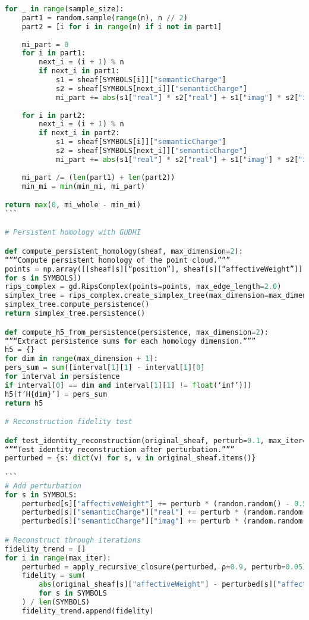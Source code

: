 \documentclass[11pt]{article}
\begin{document}
\begin{lstlisting}[language=Python, caption={EEG-LIGO Combined Analysis - Complete Code}]
for _ in range(sample_size):
    part1 = random.sample(range(n), n // 2)
    part2 = [i for i in range(n) if i not in part1]
    
    mi_part = 0
    for i in part1:
        next_i = (i + 1) % n
        if next_i in part1:
            s1 = sheaf[SYMBOLS[i]]["semanticCharge"]
            s2 = sheaf[SYMBOLS[next_i]]["semanticCharge"]
            mi_part += abs(s1["real"] * s2["real"] + s1["imag"] * s2["imag"])
    
    for i in part2:
        next_i = (i + 1) % n
        if next_i in part2:
            s1 = sheaf[SYMBOLS[i]]["semanticCharge"]
            s2 = sheaf[SYMBOLS[next_i]]["semanticCharge"]
            mi_part += abs(s1["real"] * s2["real"] + s1["imag"] * s2["imag"])
    
    mi_part /= (len(part1) + len(part2))
    min_mi = min(min_mi, mi_part)

return max(0, mi_whole - min_mi)
```

# Persistent homology with GUDHI

def compute_persistent_homology(sheaf, max_dimension=2):
“”“Compute persistent homology of the point cloud.”””
points = np.array([[sheaf[s][“position”], sheaf[s][“affectiveWeight”]]
for s in SYMBOLS])
rips_complex = gd.RipsComplex(points=points, max_edge_length=2.0)
simplex_tree = rips_complex.create_simplex_tree(max_dimension=max_dimension + 1)
simplex_tree.compute_persistence()
return simplex_tree.persistence()

def compute_h5_from_persistence(persistence, max_dimension=2):
“”“Extract persistence sums for each homology dimension.”””
h5 = {}
for dim in range(max_dimension + 1):
pers_sum = sum([interval[1][1] - interval[1][0]
for interval in persistence
if interval[0] == dim and interval[1][1] != float(‘inf’)])
h5[f’H{dim}’] = pers_sum
return h5

# Reconstruction fidelity test

def test_identity_reconstruction(original_sheaf, perturb=0.1, max_iter=25):
“”“Test identity reconstruction after perturbation.”””
perturbed = {s: dict(v) for s, v in original_sheaf.items()}

```
# Add perturbation
for s in SYMBOLS:
    perturbed[s]["affectiveWeight"] += perturb * (random.random() - 0.5)
    perturbed[s]["semanticCharge"]["real"] += perturb * (random.random() - 0.5)
    perturbed[s]["semanticCharge"]["imag"] += perturb * (random.random() - 0.5)

# Reconstruct through iterations
fidelity_trend = []
for i in range(max_iter):
    perturbed = apply_recursive_closure(perturbed, ρ=0.9, perturb=0.05)
    fidelity = sum(
        abs(original_sheaf[s]["affectiveWeight"] - perturbed[s]["affectiveWeight"])
        for s in SYMBOLS
    ) / len(SYMBOLS)
    fidelity_trend.append(fidelity)
    

\end{lstlisting}
\end{document}

